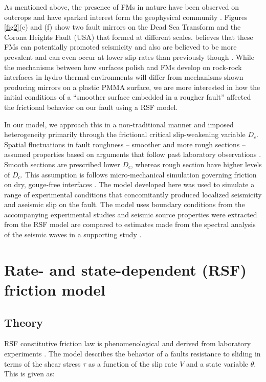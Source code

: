 \documentclass[final,3p, 11pt,authoryear]{elsarticle}
\begin{document}
As mentioned above, the presence of FMs in nature have been observed on outcrops and have sparked interest form the geophysical community \citep{Fondriest2013, Kirkpartick2013, Siman-Tov2013}.  Figures \ref{fig2}(e) and (f) show two fault mirrors on the Dead Sea Transform and the Corona Heights Fault (USA) that formed at different scales.  \citep{Goldberg2016} believes that these FMs can potentially promoted seismicity and also are believed to be more prevalent and can even occur at lower slip-rates than previously though \citep{Verbena2019}.  While the mechanisms between how surfaces polish and FMs develop on rock-rock interfaces in hydro-thermal environments will differ from mechanisms shown producing mirrors on a plastic PMMA surface, we are  more interested in how the initial conditions of a ``smoother surface embedded in a rougher fault'' affected the frictional behavior on our fault using a RSF model. 

 In our model, we approach this in a non-traditional manner and imposed heterogeneity primarily through the frictional critical slip-weakening variable $D_{c}$. Spatial fluctuations in fault roughness -- smoother and more rough sections -- assumed properties based on arguments that follow past laboratory observations \citep{Dieterich1981, Marone1973, Marone1994}. Smooth sections are prescribed lower $D_{c}$, whereas rough section have higher levels of $D_{c}$. This assumption is follows micro-mechanical simulation governing friction on dry, gouge-free interfaces \citep{Yoshioka1996}. The model developed here was used to simulate a range of experimental conditions that concomitantly produced localized seismicity and aseismic slip on the fault. The model uses boundary conditions from the accompanying experimental studies and seismic source properties were extracted from the RSF  model are compared to estimates made from the spectral analysis of the seismic waves in a supporting study \citep{Selvadurai2019}.

\section{Rate- and state-dependent (RSF) friction model}
\subsection{Theory}
\label{Theory}
RSF constitutive friction law is phenomenological and derived from laboratory experiments \citep{Dieterich1979, Ruina1983}.  The model describes the behavior of a faults resistance to sliding in terms of the shear stress $\tau$ as a function of the slip rate $V$ and a state variable $\theta$. This is given as:
\end{document}
